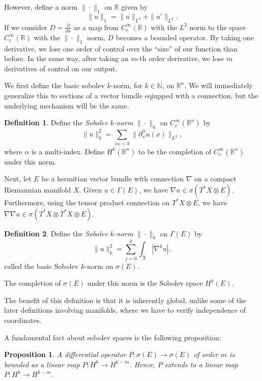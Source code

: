 \documentclass[14pt, reqno]{extarticle}
\theoremstyle{plain}
\newtheorem{proposition}{Proposition}[section]
\theoremstyle{definition}
\newtheorem{definition}{Definition}[section]
\theoremstyle{remark}
\newcommand{\RR}{\mathbb{R}}
\newcommand{\der}[2]{\frac{\partial #1}{\partial #2}}
\begin{document}
However, define a norm $\|\cdot\|_1$ on $\RR$ given by
\[
    \|u\|_{1} = \|u\|_{L^2} + \|u'\|_{L^2}.
\]
If we consider $D = \der{}{x}$ as a map from $C_c^\infty(\RR)$ with the $L^2$ norm to the space
$C_c^\infty(\RR)$ with the $\|\cdot\|_1$ norm, $D$ becomes a bounded operator. By taking
one derivative, we lose one order of control over the ``size'' of our function than before. In the 
same way, after taking an $m$-th order derivative, we lose $m$ derivatives of control on our output.

We first define the basic sobolev $k$-norm, for $k \in \mathbb{N}$, on $\RR^n$. We will 
immediately generalize this to sections of a vector bundle eqiupped with a connection,
but the underlying mechanism will be the same. 

\begin{definition}
    Define the \textit{Sobolev $k$-norm} $\|\cdot\|_k$ on $C_c^\infty(\RR^n)$ by 
    \[
        \|u\|_k^2 = \sum_{|\alpha|<k} \|\partial_x^\alpha u(x)\|_{L^2},
    \]
    where $\alpha$ is a multi-index. Define $H^k(\RR^n)$ to be the completion of $C_c^\infty(\RR^n)$ under 
    this norm.
\end{definition}

Next, let $E$ be a hermitian vector bundle with connection $\nabla$ on a compact Riemannian manifold $X$. Given 
$u \in \Gamma(E)$, we have $\nabla u \in \sigma(T^*X \otimes E)$. Furthermore, using the tensor product
connection on $T^*X \otimes E$, we have $\nabla \nabla u \in \sigma(T^*X\otimes T^*X \otimes E)$. 

\begin{definition}\label{orig}
    Define the \textit{Sobolev $k$-norm} $\|\cdot\|_k$ on $\Gamma(E)$ by
    \[
        \|u\|_k^2 = \sum_{j = 0}^k \int_X |\nabla^k u|,
    \]
    called the basic Sobolev $k$-norm on $\sigma(E)$.

    The completion of $\sigma(E)$ under this norm is the Sobolev space $H^k(E)$.
\end{definition}

The benefit of this definition is that it is inherently global, unlike some of the later
definitions involving manifolds, where we have to verify independence of coordinates.

A fundamental fact about sobolev spaces is the following proposition:

\begin{proposition}\label{basic}
    A differential operator $P: \sigma(E) \to \sigma(E)$ of order $m$ is bounded 
    as a linear map $P: H^k \to H^{k-m}$. Hence, $P$ extends to a linear
    map $P: H^k \to H^{k-m}$. 
\end{proposition}
\end{document}

